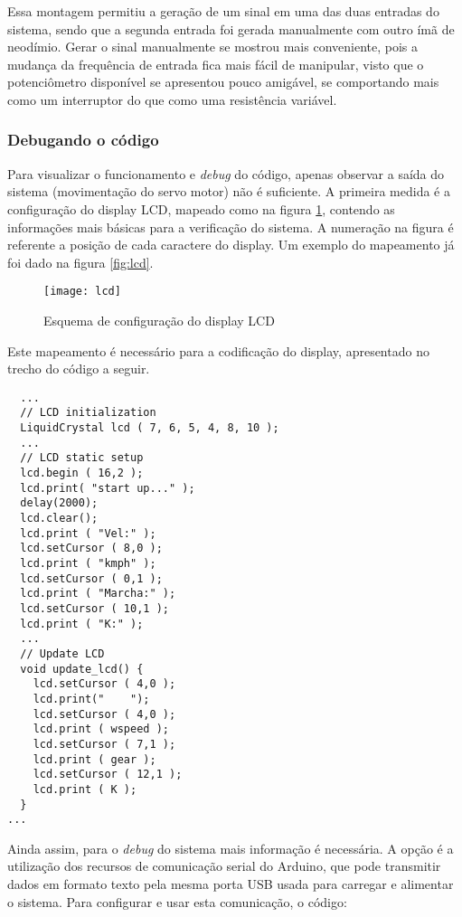 \documentclass[a4paper,11pt]{article}
\begin{document}
Essa montagem permitiu a geração de um sinal em uma das duas entradas do
sistema, sendo que a segunda entrada foi gerada manualmente com outro ímã de
neodímio. Gerar o sinal manualmente se mostrou mais conveniente, pois a mudança
da frequência de entrada fica mais fácil de manipular, visto que o
potenciômetro disponível se apresentou pouco amigável, se comportando mais como
um interruptor do que como uma resistência variável.

\subsubsection{Debugando o código}

Para visualizar o funcionamento e \textit{debug} do código, apenas observar a
saída do sistema (movimentação do servo motor) não é suficiente. A primeira
medida é a configuração do display LCD, mapeado como na figura
\ref{fig:schemalcd}, contendo as informações mais básicas para a verificação do
sistema. A numeração na figura é referente a posição de cada caractere do
display. Um exemplo do mapeamento já foi dado na figura \ref{fig:lcd}.

\begin{figure}[h!]
\begin{center}
  \texttt{[image: lcd]}
\end{center}
  \caption{Esquema de configuração do display LCD}
  \label{fig:schemalcd}
\end{figure}

Este mapeamento é necessário para a codificação do display, apresentado no
trecho do código a seguir.
\begin{lstlisting}
  ...
  // LCD initialization
  LiquidCrystal lcd ( 7, 6, 5, 4, 8, 10 );
  ...
  // LCD static setup
  lcd.begin ( 16,2 );
  lcd.print( "start up..." );
  delay(2000);
  lcd.clear();
  lcd.print ( "Vel:" );
  lcd.setCursor ( 8,0 );
  lcd.print ( "kmph" );
  lcd.setCursor ( 0,1 );
  lcd.print ( "Marcha:" );
  lcd.setCursor ( 10,1 );
  lcd.print ( "K:" );
  ...
  // Update LCD
  void update_lcd() {
    lcd.setCursor ( 4,0 );
    lcd.print("    ");
    lcd.setCursor ( 4,0 );
    lcd.print ( wspeed );
    lcd.setCursor ( 7,1 );
    lcd.print ( gear );
    lcd.setCursor ( 12,1 );
    lcd.print ( K );
  }
...
\end{lstlisting}

Ainda assim, para o \textit{debug} do sistema mais informação é necessária. A
opção é a utilização dos recursos de comunicação serial do Arduino, que pode
transmitir dados em formato texto pela mesma porta USB usada para carregar e
alimentar o sistema. Para configurar e usar esta comunicação, o código:
\end{document}
